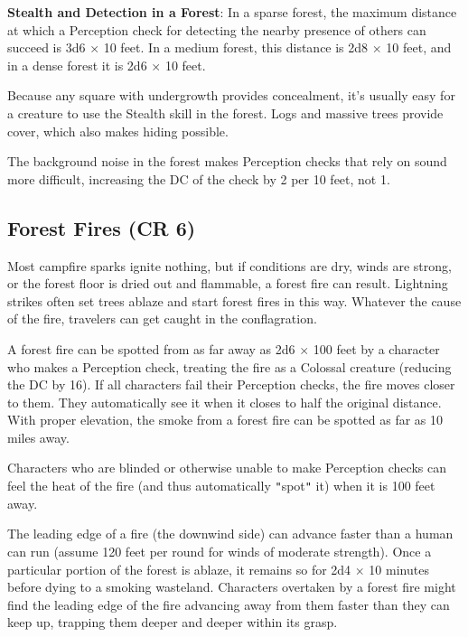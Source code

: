 \textbf{Stealth and Detection in a Forest}: In a sparse forest, the maximum distance at which a Perception check for detecting the nearby presence of others can succeed is 3d6 \mbox{$\times$} 10 feet. In a medium forest, this distance is 2d8 \mbox{$\times$} 10 feet, and in a dense forest it is 2d6 \mbox{$\times$} 10 feet.
				
Because any square with undergrowth provides concealment, it's usually easy for a creature to use the Stealth skill in the forest. Logs and massive trees provide cover, which also makes hiding possible.
				
The background noise in the forest makes Perception checks that rely on sound more difficult, increasing the DC of the check by 2 per 10 feet, not 1. 
				
\subsection{Forest Fires (CR 6)}

				
Most campfire sparks ignite nothing, but if conditions are dry, winds are strong, or the forest floor is dried out and flammable, a forest fire can result. Lightning strikes often set trees ablaze and start forest fires in this way. Whatever the cause of the fire, travelers can get caught in the conflagration.
				
A forest fire can be spotted from as far away as 2d6 \mbox{$\times$} 100 feet by a character who makes a Perception check, treating the fire as a Colossal creature (reducing the DC by 16). If all characters fail their Perception checks, the fire moves closer to them. They automatically see it when it closes to half the original distance. With proper elevation, the smoke from a forest fire can be spotted as far as 10 miles away.
				
Characters who are blinded or otherwise unable to make Perception checks can feel the heat of the fire (and thus automatically \texttt{{}"{}}spot\texttt{{}"{}} it) when it is 100 feet away.
				
The leading edge of a fire (the downwind side) can advance faster than a human can run (assume 120 feet per round for winds of moderate strength). Once a particular portion of the forest is ablaze, it remains so for 2d4 \mbox{$\times$} 10 minutes before dying to a smoking wasteland. Characters overtaken by a forest fire might find the leading edge of the fire advancing away from them faster than they can keep up, trapping them deeper and deeper within its grasp.
				
